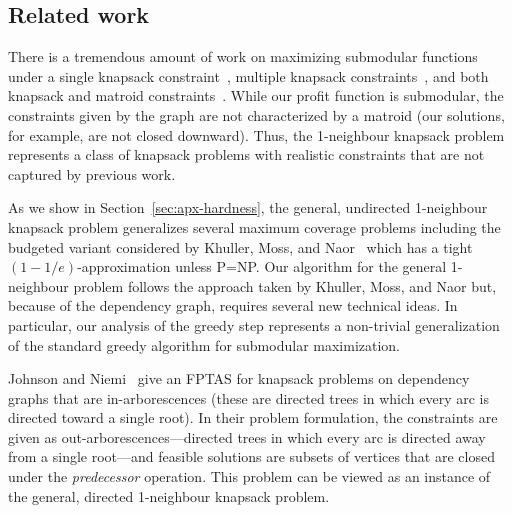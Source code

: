 \documentclass[12pt]{article}
\begin{document}
\subsection{Related work} \label{sec:related}

There is a tremendous amount of work on maximizing submodular functions under a single knapsack constraint~\cite{Sviridenko:orl2004}, multiple knapsack constraints~\cite{Kulik:2009}, and both knapsack and matroid constraints~\cite{Lee:2009,groundan-schulz:prepreint2009}.  While our profit function is submodular, the constraints given by the graph are not characterized by a matroid (our solutions, for example, are not closed downward).  Thus, the 1-neighbour knapsack problem represents a class of knapsack problems with realistic constraints that are not captured by previous work.

As we show in Section~\ref{sec:apx-hardness}, the general, undirected 1-neighbour knapsack problem generalizes several maximum coverage problems including the budgeted variant considered by Khuller, Moss, and Naor~\cite{kmn:ipl1999} which has a tight $(1-1/e)$-approximation unless P=NP.  Our algorithm for the general 1-neighbour problem follows the approach taken by Khuller, Moss, and Naor but, because of the dependency graph, requires several new technical ideas.  In particular, our analysis of the greedy step represents a non-trivial generalization of the standard greedy algorithm for submodular maximization.



























Johnson and Niemi~\cite{Johnson:1983p1256} give an FPTAS for knapsack
problems on dependency graphs that are in-arborescences (these are
directed trees in which every arc is directed toward a single root).
In their problem formulation, the constraints are given as
out-arborescences---directed trees in which every arc is directed away
from a single root---and feasible solutions are subsets of vertices
that are closed under the {\em predecessor} operation. This problem
can be viewed as an instance of the general, directed 1-neighbour
knapsack problem.
\end{document}
